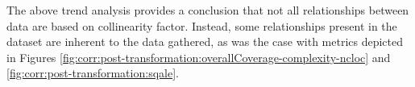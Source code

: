The above trend analysis provides a conclusion that not all relationships between data are based on collinearity factor. Instead, some relationships present in the dataset are inherent to the data gathered, as was the case with metrics depicted in Figures \ref{fig:corr:post-transformation:overallCoverage-complexity-ncloc} and \ref{fig:corr:post-transformation:sqale}.
\FloatBarrier